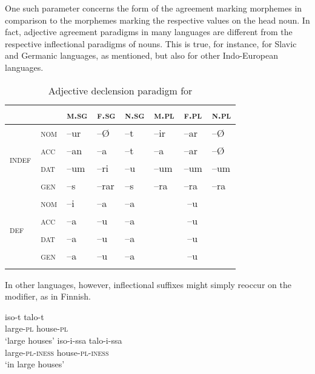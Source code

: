 One such parameter concerns the form of the agreement marking morphemes in comparison to the morphemes marking the respective values on the head noun. In fact, adjective agreement paradigms in many languages are different from the respective inflectional paradigms of nouns. This is true, for instance, for Slavic and Germanic languages, as mentioned, but also for other Indo-European languages. 
\begin{table}
\begin{tabular}{l l  l l l  l l l}
\lsptoprule
		&		&\textsc{m.sg}&\textsc{f.sg}&\textsc{n.sg}&\textsc{m.pl}&\textsc{f.pl}&\textsc{n.pl}\\
\midrule
		\multirow{4}{*}{\textsc{indef}} &\textsc{nom}	&–ur		&–Ø	&–t		&–ir		&–ar		&–Ø \\
		&\textsc{acc}	&–an		&–a	&–t		&–a		&–ar		&–Ø \\
		&\textsc{dat}	&–um		&–ri	&–u		& –um&–um&–um\\
		&\textsc{gen}	&–s		&–rar	&–s		& –ra&–ra&–ra\\
\midrule
		\multirow{4}{*}{\textsc{def}}	&\textsc{nom}	&–i		&–a		&–a		&\multicolumn{3}{c}{–u}\\
		&\textsc{acc}	&–a		&–u		&–a		&\multicolumn{3}{c}{–u}\\
		&\textsc{dat}	&–a		&–u		&–a		&\multicolumn{3}{c}{–u}\\
		&\textsc{gen}	&–a		&–u		&–a		&\multicolumn{3}{c}{–u}\\
\lspbottomrule
\end{tabular}
\caption[Adjective paradigm for \textsc{Icelandic}]{Adjective declension paradigm for }
\label{icelandic agr}
\end{table}
In other languages, however, inflectional suffixes might simply reoccur on the modifier, as in Finnish.
\begin{exe}
\ex 
{} \label{finnish agr.}
\begin{xlist}
\ex
\gll 	iso-t		talo-t\\
	large-\textsc{pl}	house-\textsc{pl}\\
\glt	‘large houses’
\ex
\gll 	iso-i-ssa		talo-i-ssa\\
	large-\textsc{pl}-\textsc{iness} house-\textsc{pl}-\textsc{iness}\\
\glt	‘in large houses’
\end{xlist}
\end{exe}
